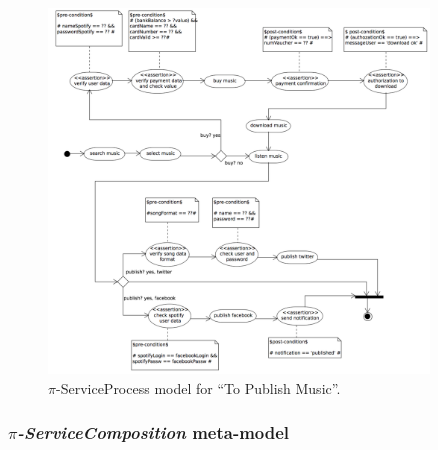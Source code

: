 \begin{figure}
\center
\includegraphics[width=0.9\textwidth]{figs/ServiceProcess.pdf}
\caption{\label{fig:CIM:serviceprocess} $\pi$-ServiceProcess model for ``To Publish Music''.}
\end{figure}

\subsubsection{\textit{$\pi$-ServiceComposition} meta-model}%

